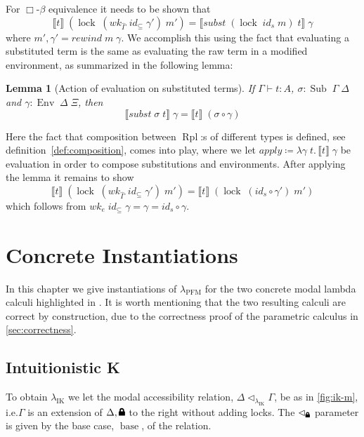 \documentclass[12pt,twoside,openright]{report}
\numberwithin{equation}{chapter}
\numberwithin{figure}{chapter}
\numberwithin{table}{chapter}
\newtheorem{lemma}[theorem]{Lemma}
\theoremstyle{definition}\newtheorem{definition}{Definition}
\newcommand{\lock}{\text{\tikz[baseline]{
      \fill[rounded corners=.1ex] (-.75ex,0) rectangle (.75ex,1ex);
      \draw[line width=.3ex] (-.4ex,.5ex) -- ++(0,.75ex) arc (180:0:.4ex) -- ++(0,-.75ex);
}}}
\begin{document}
For $\Box\text{-}\beta$ equivalence it needs to be shown that
$$ \llbracket t \rrbracket \; (\operatorname{lock} \; (\textit{wk}_{\widehat\Gamma} \; \textit{id}_\subseteq \; \gamma') \; m') = \llbracket \textit{subst} \; (\operatorname{lock} \; \textit{id}_s \; m) \; t \rrbracket \; \gamma $$
where $m' , \gamma' = \textit{rewind} \; m \; \gamma$.
We accomplish this using the fact that evaluating a substituted term
is the same as evaluating the raw term in a modified environment,
as summarized in the following lemma:
\begin{lemma}[Action of evaluation on substituted terms]
  If $\Gamma \vdash t : A$, $\sigma : \operatorname{Sub} \; \Gamma \; \Delta$
  and $\gamma : \operatorname{Env} \; \Delta \; \Xi$, then
  $$ \llbracket \textit{subst} \; \sigma \; t \rrbracket \; \gamma = \llbracket t \rrbracket \; (\sigma \circ \gamma) $$
\end{lemma}
Here the fact that composition between $\operatorname{Rpl}$:s of different types is defined,
see definition~\ref{def:composition}, comes into play,
where we let $\textit{apply} \coloneqq \lambda \gamma \; t.\, \llbracket t \rrbracket \; \gamma$ be evaluation
in order to compose substitutions and environments.
After applying the lemma it remains to show
$$ \llbracket t \rrbracket \; (\operatorname{lock} \; (\textit{wk}_{\widehat\Gamma} \; \textit{id}_\subseteq \; \gamma') \; m') = \llbracket t \rrbracket \; (\operatorname{lock} \; (\textit{id}_s \circ \gamma') \; m') $$
which follows from
$wk_e \; \textit{id}_\subseteq \; \gamma = \gamma = \textit{id}_s \circ \gamma$.

\chapter{Concrete Instantiations}\label{sec:instantiations}

In this chapter we give instantiations of $\lambda_\text{PFM}$
for the two concrete modal lambda calculi highlighted in \cite{valliappan22}.
It is worth mentioning that the two resulting calculi are correct by construction,
due to the correctness proof of the parametric calculus in \autoref{sec:correctness}.

\section{Intuitionistic K}\label{sec:ik}

To obtain $\lambda_\text{IK}$ we let the modal accessibility relation,
$\Delta \lhd_{\lambda_\text{IK}} \Gamma$, be as in \autoref{fig:ik-m},
i.e.\@ $\Gamma$ is an extension of $\Delta, \lock$ to the right without adding locks.
The $\lhd_\lock$ parameter is given by the base case, $\operatorname{base}$, of the relation.
\end{document}

